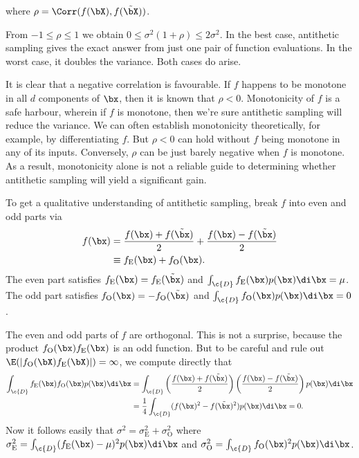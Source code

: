 where \(\rho = \Corr(f(\bX), f(\tilde{\bX}))\).

From \(-1 \le \rho \le 1\) we obtain \(0 \le \sigma^2(1+\rho) \le 2\sigma^2\). In the best case, antithetic sampling gives the exact answer from just one pair of function evaluations. In the worst case, it doubles the variance. Both cases do arise.

It is clear that a negative correlation is favourable. If \(f\) happens to be monotone in all \(d\) components of \(\bx\), then it is known that \(\rho < 0\). Monotonicity of \(f\) is a safe harbour, wherein if \(f\) is monotone, then we're sure antithetic sampling will reduce the variance. We can often establish monotonicity theoretically, for example, by differentiating \(f\). But \(\rho < 0\) can hold without \(f\) being monotone in any of its inputs. Conversely, \(\rho\) can be just barely negative when \(f\) is monotone. As a result, monotonicity alone is not a reliable guide to determining whether antithetic sampling will yield a significant gain.

To get a qualitative understanding of antithetic sampling, break \(f\) into even and odd parts via
\begin{align} \label{eq:EvenOddDecomposition}
	f(\bx) & = \frac{f(\bx) + f(\tilde{\bx})}{2} + \frac{f(\bx) - f(\tilde{\bx})}{2} \notag \\
	       & \equiv f_{\mathrm{E}}(\bx) + f_{\mathrm{O}}(\bx).
\end{align}
The even part satisfies \(f_{\mathrm{E}}(\bx) = f_{\mathrm{E}}(\tilde{\bx})\) and \(\int_{\c{D}} f_{\mathrm{E}}(\bx)p(\bx) \di \bx = \mu\). The odd part satisfies \(f_{\mathrm{O}}(\bx) = -f_{\mathrm{O}}(\tilde{\bx})\) and \(\int_{\c{D}} f_{\mathrm{O}}(\bx)p(\bx) \di \bx = 0\).

The even and odd parts of \(f\) are orthogonal. This is not a surprise, because the product \(f_{\mathrm{O}}(\bx)f_{\mathrm{E}}(\bx)\) is an odd function. But to be careful and rule out \(\E(|f_{\mathrm{O}}(\bX)f_{\mathrm{E}}(\bX)|) = \infty\), we compute directly that
\begin{align*}
	\int_{\c{D}} f_{\mathrm{E}}(\bx)f_{\mathrm{O}}(\bx)p(\bx) \di \bx & = \int_{\c{D}} \left(\frac{f(\bx) + f(\tilde{\bx})}{2}\right) \left(\frac{f(\bx) - f(\tilde{\bx})}{2}\right) p(\bx) \di \bx \\
	                                                                  & = \frac{1}{4} \int_{\c{D}} (f(\bx)^2 - f(\tilde{\bx})^2) p(\bx) \di \bx = 0.
\end{align*}
Now it follows easily that \(\sigma^2 = \sigma_{\mathrm{E}}^2 + \sigma_{\mathrm{O}}^2\) where \(\sigma_{\mathrm{E}}^2 = \int_{\c{D}} (f_{\mathrm{E}}(\bx) - \mu)^2 p(\bx) \di \bx\) and \(\sigma_{\mathrm{O}}^2 = \int_{\c{D}} f_{\mathrm{O}}(\bx)^2 p(\bx) \di \bx\).

